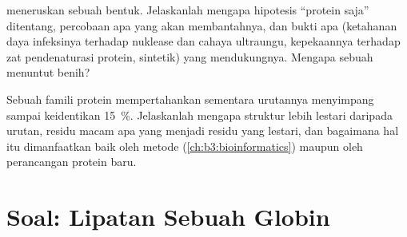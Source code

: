 \begin{exercise}[$\star\star\star$]\label{exo:b3:structural-biology:11}
 meneruskan sebuah bentuk. Jelaskanlah mengapa hipotesis ``protein saja''
ditentang, percobaan apa yang akan membantahnya, dan bukti apa
(ketahanan daya infeksinya terhadap nuklease dan cahaya ultraungu,
kepekaannya terhadap zat pendenaturasi protein,  sintetik) yang
mendukungnya. Mengapa sebuah  menuntut benih?
\end{exercise}

\begin{exercise}[$\star\star\star$]\label{exo:b3:structural-biology:12}
Sebuah famili protein mempertahankan  sementara urutannya menyimpang
sampai keidentikan \qty{15}{\%}. Jelaskanlah mengapa struktur lebih lestari
daripada urutan, residu macam apa yang menjadi residu yang lestari, dan
bagaimana hal itu dimanfaatkan baik oleh metode 
(\cref{ch:b3:bioinformatics}) maupun oleh perancangan protein baru.
\end{exercise}

\section{Soal: Lipatan Sebuah Globin}

